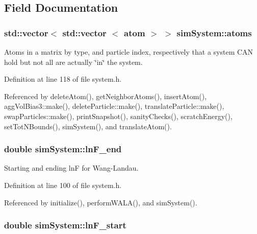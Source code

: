 \subsection{Field Documentation}
\hypertarget{classsim_system_a90421b19082f7fb8fc23b7264b1161e4}{
\subsubsection[{atoms}]{\setlength{\rightskip}{0pt plus 5cm}std\-::vector$<$ std\-::vector $<$ {\bf atom} $>$ $>$ sim\-System\-::atoms}}\label{classsim_system_a90421b19082f7fb8fc23b7264b1161e4}


Atoms in a matrix by type, and particle index, respectively that a system C\-A\-N hold but not all are actually \char`\"{}in\char`\"{} the system. 



Definition at line 118 of file system.\-h.



Referenced by delete\-Atom(), get\-Neighbor\-Atoms(), insert\-Atom(), agg\-Vol\-Bias3\-::make(), delete\-Particle\-::make(), translate\-Particle\-::make(), swap\-Particles\-::make(), print\-Snapshot(), sanity\-Checks(), scratch\-Energy(), set\-Tot\-N\-Bounds(), sim\-System(), and translate\-Atom().

\hypertarget{classsim_system_a3fb5d01fd3abf49f577c050968fba9d1}{
\subsubsection[{ln\-F\-\_\-end}]{\setlength{\rightskip}{0pt plus 5cm}double sim\-System\-::ln\-F\-\_\-end}}\label{classsim_system_a3fb5d01fd3abf49f577c050968fba9d1}


Starting and ending ln\-F for Wang-\/\-Landau. 



Definition at line 100 of file system.\-h.



Referenced by initialize(), perform\-W\-A\-L\-A(), and sim\-System().

\hypertarget{classsim_system_a794334e163fbeb4b4f61bcea676679ce}{
\subsubsection[{ln\-F\-\_\-start}]{\setlength{\rightskip}{0pt plus 5cm}double sim\-System\-::ln\-F\-\_\-start}}\label{classsim_system_a794334e163fbeb4b4f61bcea676679ce}


